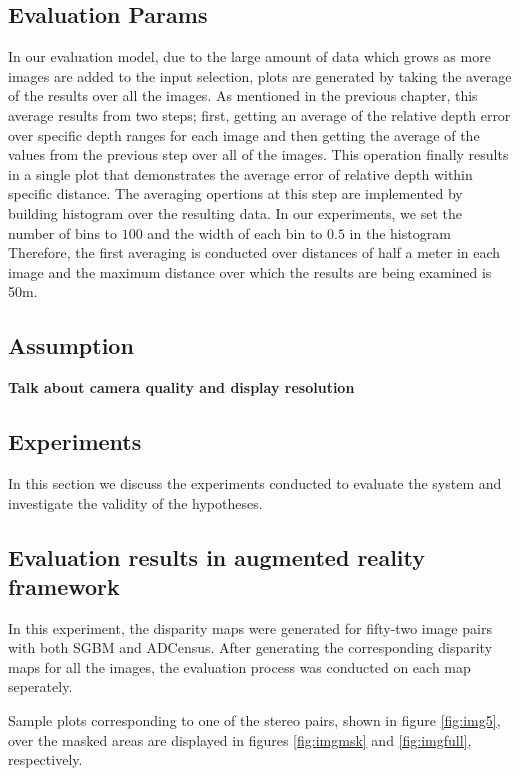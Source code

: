 \subsection{Evaluation Params}
In our evaluation model, due to the large amount of data which grows as more images are added to the input selection, 
plots are generated by taking the average of the results over all the images. As mentioned in the previous chapter, this average results from two steps; 
first, getting an average of the relative depth error over specific
depth ranges for each image and then getting the average of the values from the previous step over all of the images. This operation finally results in a single plot
that demonstrates the average error of relative depth within specific distance.
The averaging opertions at this step are implemented by building histogram over the resulting data. 
In our experiments, we set the number of bins to $100$ and the width of each bin to $0.5$ in the histogram 
Therefore, the first averaging is conducted over distances of half a meter in each image and the maximum distance over which the results are 
being examined is 50m.

\subsection{Assumption}
\textbf{Talk about camera quality and display resolution}

\subsection{Experiments}
In this section we discuss the experiments conducted to evaluate the system and investigate the validity of the hypotheses.

\subsection{Evaluation results in augmented reality framework}

In this experiment, the disparity maps 
were generated for fifty-two image pairs with both SGBM and ADCensus. 
After generating the corresponding disparity maps for all the images, 
the evaluation process was conducted on each map seperately.

Sample plots corresponding to one of the stereo pairs, shown in figure \ref{fig:img5},
over the masked areas are displayed in figures \ref{fig:imgmsk} and \ref{fig:imgfull}, respectively.


